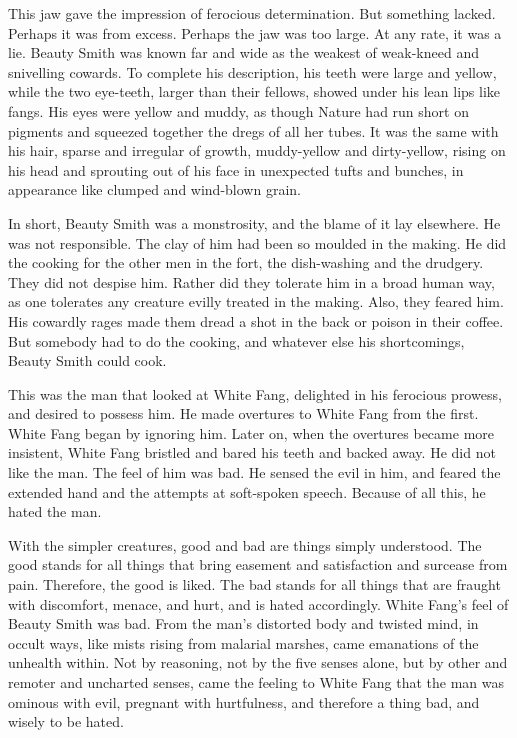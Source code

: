 \documentclass[10pt]{book}
\begin{document}
This jaw gave the impression of ferocious determination. But something
lacked. Perhaps it was from excess. Perhaps the jaw was too large. At
any rate, it was a lie. Beauty Smith was known far and wide as the
weakest of weak-kneed and snivelling cowards. To complete his
description, his teeth were large and yellow, while the two eye-teeth,
larger than their fellows, showed under his lean lips like fangs. His
eyes were yellow and muddy, as though Nature had run short on pigments
and squeezed together the dregs of all her tubes. It was the same with
his hair, sparse and irregular of growth, muddy-yellow and
dirty-yellow, rising on his head and sprouting out of his face in
unexpected tufts and bunches, in appearance like clumped and wind-blown
grain.

In short, Beauty Smith was a monstrosity, and the blame of it lay
elsewhere. He was not responsible. The clay of him had been so moulded
in the making. He did the cooking for the other men in the fort, the
dish-washing and the drudgery. They did not despise him. Rather did
they tolerate him in a broad human way, as one tolerates any creature
evilly treated in the making. Also, they feared him. His cowardly rages
made them dread a shot in the back or poison in their coffee. But
somebody had to do the cooking, and whatever else his shortcomings,
Beauty Smith could cook.

This was the man that looked at White Fang, delighted in his ferocious
prowess, and desired to possess him. He made overtures to White Fang
from the first. White Fang began by ignoring him. Later on, when the
overtures became more insistent, White Fang bristled and bared his
teeth and backed away. He did not like the man. The feel of him was
bad. He sensed the evil in him, and feared the extended hand and the
attempts at soft-spoken speech. Because of all this, he hated the man.

With the simpler creatures, good and bad are things simply understood.
The good stands for all things that bring easement and satisfaction and
surcease from pain. Therefore, the good is liked. The bad stands for
all things that are fraught with discomfort, menace, and hurt, and is
hated accordingly. White Fang’s feel of Beauty Smith was bad. From the
man’s distorted body and twisted mind, in occult ways, like mists
rising from malarial marshes, came emanations of the unhealth within.
Not by reasoning, not by the five senses alone, but by other and
remoter and uncharted senses, came the feeling to White Fang that the
man was ominous with evil, pregnant with hurtfulness, and therefore a
thing bad, and wisely to be hated.
\end{document}
